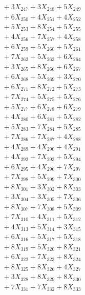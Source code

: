\documentclass[a4paper,10pt]{article}
\begin{document}
{\begin{align}
&\;  + 3 X_{247} + 3 X_{248} + 5 X_{249} \\[0.5ex]\allowbreak
&\;  + 6 X_{250} + 4 X_{251} + 4 X_{252} \\[0.3ex]
&\;  + 5 X_{253} + 8 X_{254} + 5 X_{255} \\[0.3ex]
&\;  + 4 X_{256} + 7 X_{257} + 4 X_{258} \\[0.3ex]
&\;  + 6 X_{259} + 5 X_{260} + 5 X_{261} \\[0.3ex]
&\;  + 7 X_{262} + 5 X_{263} + 6 X_{264} \\[0.3ex]
&\;  + 3 X_{265} + 8 X_{266} + 6 X_{267} \\[0.3ex]
&\;  + 6 X_{268} + 5 X_{269} + 3 X_{270} \\[0.3ex]
&\;  + 6 X_{271} + 8 X_{272} + 5 X_{273} \\[0.3ex]
&\;  + 7 X_{274} + 5 X_{275} + 5 X_{276} \\[0.3ex]
&\;  + 5 X_{277} + 6 X_{278} + 6 X_{279} \\[0.5ex]\allowbreak
&\;  + 4 X_{280} + 6 X_{281} + 5 X_{282} \\[0.3ex]
&\;  + 5 X_{283} + 7 X_{284} + 5 X_{285} \\[0.3ex]
&\;  + 7 X_{286} + 7 X_{287} + 4 X_{288} \\[0.3ex]
&\;  + 4 X_{289} + 4 X_{290} + 4 X_{291} \\[0.3ex]
&\;  + 4 X_{292} + 7 X_{293} + 5 X_{294} \\[0.3ex]
&\;  + 6 X_{295} + 4 X_{296} + 7 X_{297} \\[0.3ex]
&\;  + 7 X_{298} + 5 X_{299} + 7 X_{300} \\[0.3ex]
&\;  + 8 X_{301} + 3 X_{302} + 8 X_{303} \\[0.3ex]
&\;  + 3 X_{304} + 3 X_{305} + 7 X_{306} \\[0.3ex]
&\;  + 8 X_{307} + 7 X_{308} + 5 X_{309} \\[0.5ex]\allowbreak
&\;  + 7 X_{310} + 4 X_{311} + 5 X_{312} \\[0.3ex]
&\;  + 4 X_{313} + 5 X_{314} + 3 X_{315} \\[0.3ex]
&\;  + 6 X_{316} + 5 X_{317} + 5 X_{318} \\[0.3ex]
&\;  + 8 X_{319} + 5 X_{320} + 8 X_{321} \\[0.3ex]
&\;  + 6 X_{322} + 7 X_{323} + 8 X_{324} \\[0.3ex]
&\;  + 8 X_{325} + 8 X_{326} + 4 X_{327} \\[0.3ex]
&\;  + 3 X_{328} + 8 X_{329} + 8 X_{330} \\[0.3ex]
&\;  + 7 X_{331} + 7 X_{332} + 8 X_{333} \\[0.3ex]

\end{align}}
\end{document}
